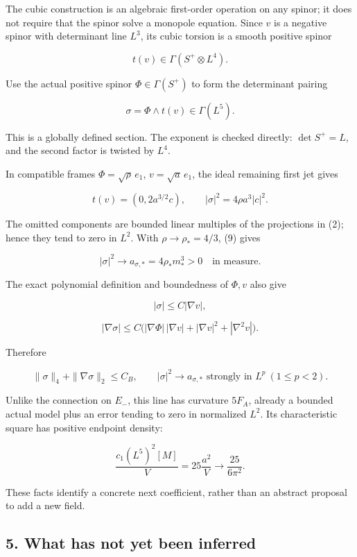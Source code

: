 \documentclass[11pt]{article}
\begin{document}
The cubic construction is an algebraic first-order operation on any
spinor; it does not require that the spinor solve a monopole equation.
Since \(v\) is a negative spinor with determinant line \(L^3\), its
cubic torsion is a smooth positive spinor

\[
 t(v)\in\Gamma(S^+\otimes L^4).
\tag{C.10}
\]

Use the actual positive spinor \(\Phi\in\Gamma(S^+)\) to form the
determinant pairing

\[
 \boxed{\sigma=\Phi\wedge t(v)\in\Gamma(L^5).}
\tag{C.11}
\]

This is a globally defined section. The exponent is checked directly:
\(\det S^+=L\), and the second factor is twisted by \(L^4\).

In compatible frames \(\Phi=\sqrt\rho\,e_1\), \(v=\sqrt a\,e_1\), the
ideal remaining first jet gives

\[
 t(v)=(0,2a^{3/2}c),\qquad
 |\sigma|^2=4\rho a^3|c|^2.
\tag{C.12}
\]

The omitted components are bounded linear multiples of the projections
in (2); hence they tend to zero in \(L^2\). With \(\rho\to\rho_*=4/3\),
(9) gives

\[
 \boxed{|\sigma|^2\longrightarrow
 a_{\sigma,*}=4\rho_*m_*^3>0\quad\text{in measure}.}
\tag{C.13}
\]

The exact polynomial definition and boundedness of \(\Phi,v\) also give

\[
 |\sigma|\le C|\nabla v|,
\]

\[
 |\nabla\sigma|\le C\bigl(
 |\nabla\Phi|\,|\nabla v|+|\nabla v|^2+|\nabla^2v|\bigr).
\]

Therefore

\[
 \boxed{\|\sigma\|_4+\|\nabla\sigma\|_2\le C_B,
 \qquad |\sigma|^2\to a_{\sigma,*}\text{ strongly in }L^p\ (1\le p<2).}
\tag{C.14}
\]

Unlike the connection on \(E_-\), this line has curvature \(5F_A\),
already a bounded actual model plus an error tending to zero in
normalized \(L^2\). Its characteristic square has positive endpoint
density:

\[
 \frac{c_1(L^5)^2[M]}V=25\frac{a^2}{V}
 \longrightarrow\frac{25}{6\pi^2}.
\tag{C.15}
\]

These facts identify a concrete next coefficient, rather than an
abstract proposal to add a new field.

\hypertarget{what-has-not-yet-been-inferred}{%
\subsection{5. What has not yet been
inferred}\label{what-has-not-yet-been-inferred}}
\end{document}
